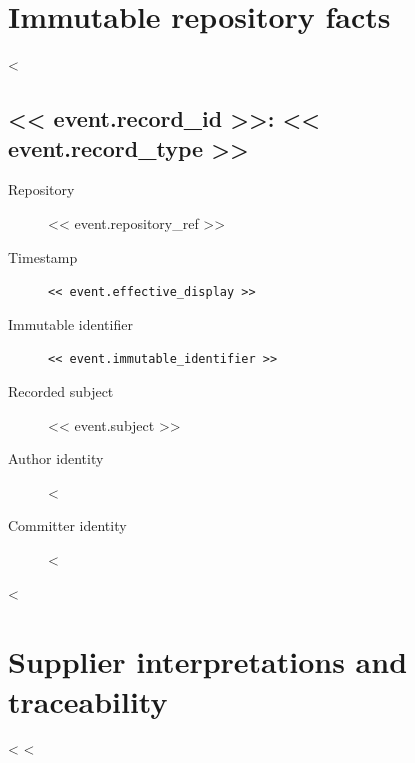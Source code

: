 \documentclass[11pt]{article}
\begin{document}
\section{Immutable repository facts}
<%
\subsection{<< event.record_id >>: << event.record_type >>}
\begin{description}
\item[Repository] << event.repository_ref >>
\item[Timestamp] \nolinkurl{<< event.effective_display >>}
\item[Immutable identifier] \nolinkurl{<< event.immutable_identifier >>}
\item[Recorded subject] << event.subject >>
\item[Author identity] <%
\item[Committer identity] <%
\end{description}
<%
\section{Supplier interpretations and traceability}
<%
<%
\end{document}
